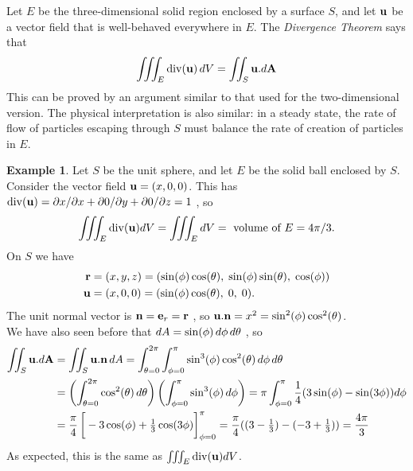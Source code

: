 \documentclass[reqno]{amsart}
\theoremstyle{definition}
\newtheorem{example}[theorem]{Example}
\begin{document}
Let $E$ be the three-dimensional solid region enclosed by a surface
$S$, and let $\mathbf{u}$ be a vector field that is well-behaved everywhere
in $E$.  The \emph{Divergence Theorem} says that
\[ \iiint_E\operatorname{div}(\mathbf{u})\,dV = \iint_S\mathbf{u}.d\mathbf{A} \] 
This can be proved by an argument similar to that used for the
two-dimensional version.  The physical interpretation is also similar:
in a steady state, the rate of flow of particles escaping through $S$
must balance the rate of creation of particles in $E$.

\begin{example}
 Let $S$ be the unit sphere, and let $E$ be the solid ball enclosed by $S$.
 Consider the vector field $\mathbf{u}=(x,0,0)$.  This has $\operatorname{div}(\mathbf{u})=
 \partial x/\partial x+\partial 0/\partial y+\partial 0/\partial z=1$ ,
 so 
 \[ \iiint_E \operatorname{div}(\mathbf{u})dV = \iiint_E dV
    = \text{ volume of } E = 4\pi/3. 
 \] 
 On $S$ we have
 \begin{align*}
  \mathbf{r} &= (x,y,z) = 
        (\sin(\phi)\cos(\theta),\;\sin(\phi)\sin(\theta),\;\cos(\phi)) \\
  \mathbf{u}  &= (x,0,0) = (\sin(\phi)\cos(\theta),\;0,\;0). 
 \end{align*} 
 The unit normal vector is $\mathbf{n}=\mathbf{e}_r=\mathbf{r}$ , so 
 $\mathbf{u}.\mathbf{n} = x^2 = \sin^2(\phi)\cos^2(\theta)$.  \\
 We have also seen before that
 $dA=\sin(\phi)\,d\phi\,d\theta$ , so
 \begin{align*}
  \iint_S \vu.d\vA
   &= \iint_S \vu.\vn\,dA
    = \int_{\azi=0}^{2\pi}\int_{\zen=0}^\pi 
                \sin^3(\zen)\cos^2(\azi)\,d\zen\,d\azi  \\
   &= \left(\int_{\azi=0}^{2\pi}\cos^2(\azi)\,d\azi\right)
      \left(\int_{\zen=0}^\pi\sin^3(\zen)\,d\zen\right)  
    = \pi\int_{\zen=0}^\pi\frac{1}{4}(3\sin(\zen)-\sin(3\zen))d\zen  \\
   &= \frac{\pi}{4}\CH{-3\cos(\zen)+\tfrac{1}{3}\cos(3\zen)}_{\zen=0}^\pi 
    = \frac{\pi}{4}((3-\tfrac{1}{3})-(-3+\tfrac{1}{3}))  
    = \frac{4\pi}{3} 
 \end{align*} 
 As expected, this is the same as $\iiint_E\operatorname{div}(\mathbf{u})dV$. 
\end{example}
\end{document}
